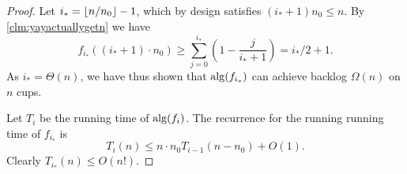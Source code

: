 \begin{proof}
  Let $i_* = \left\lfloor n/n_0 \right\rfloor-1$, which by design satisfies
  $(i_*+1)n_0 \le n$. By \cref{clm:yayactuallygetn} we have
  $$f_{i_*}((i_*+1)\cdot n_0) \ge \sum_{j=0}^{i_*} \left(1 -
  \frac{j}{i_*+1} \right) = i_*/2 + 1.$$ As $i_* = \Theta(n)$, we
  have thus shown that $\operatorname{\text{\textup{alg}}}(f_{i_*})$ can achieve backlog
  $\Omega(n)$ on $n$ cups.

  Let $T_i$ be the running time of $\operatorname{\text{\textup{alg}}}(f_i)$.
  The recurrence for the running running time of $f_{i_*}$ is 
  $$T_i(n) \le n \cdot n_0T_{i-1}(n-n_0)+O(1).$$
  Clearly $T_{i_*}(n) \le O(n!)$.

\end{proof}

